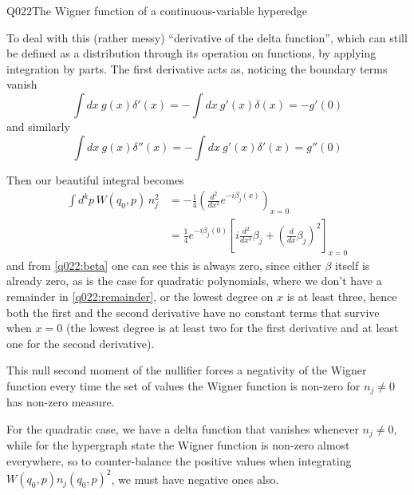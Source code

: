 \begin{entry}{Q022}{The Wigner function of a continuous-variable hyperedge}
\begin{solution}[Part (d)]
To deal with this (rather messy) ``derivative of the delta function'', which can still be defined as a distribution through its operation on functions, by applying integration by parts.
The first derivative acts as, noticing the boundary terms vanish
\begin{equation}
    \int dx\ g(x)\delta'(x) = - \int dx\ g'(x)\delta(x)=-g'(0)
\end{equation}
and similarly
\begin{equation}
    \int dx\ g(x)\delta''(x) = - \int dx\ g'(x)\delta'(x)=g''(0)
\end{equation}

Then our beautiful integral becomes
\begin{equation}
\begin{split}
    \int d^{k}p\,W(q_0,p)\,n_j^{2}&= - \frac{1}{4} \left(\frac{d^2}{dx^2} e^{-i\beta_j(x)}\right)_{x=0} \\
    &= \frac{1}{4} e^{-i\beta_j(0)} \left[i\frac{d^2}{dx^2} \beta_j + \left(\frac{d}{dx} \beta_j\right)^2 \right]_{x=0}
\end{split}
\label{q022:second-moment}
\end{equation}
and from \eqref{q022:beta} one can see this is always zero, since either $\beta$ itself is already zero, as is the case for quadratic polynomials, where we don't have a remainder in \eqref{q022:remainder}, or the lowest degree on $x$ is at least three, hence both the first and the second derivative have no constant terms that survive when $x=0$ (the lowest degree is at least two for the first derivative and at least one for the second derivative).

This null second moment of the nullifier forces a negativity of the Wigner function every time the set of values the Wigner function is non-zero for $n_j \neq 0$ has non-zero measure.

For the quadratic case, we have a delta function that vanishes whenever $n_j\neq 0$, while for the hypergraph state the Wigner function is non-zero almost everywhere, so to counter-balance the positive values when integrating $W(q_0,p)n_j(q_0,p)^2$, we must have negative ones also.

\end{solution}


\end{entry}
